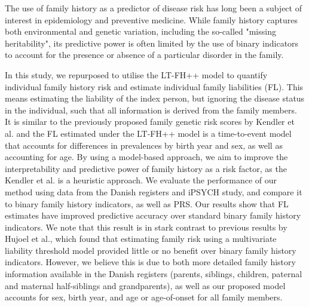 The use of family history as a predictor of disease risk has long been a subject of interest in epidemiology and preventive medicine. While family history captures both environmental and genetic variation, including the so-called "missing heritability", its predictive power is often limited by the use of binary indicators to account for the presence or absence of a particular disorder in the family. 

In this study, we repurposed to utilise the LT-FH++ model to quantify individual family history risk and estimate individual family liabilities (FL). This means estimating the liability of the index person, but ignoring the disease status in the individual, such that all information is derived from the family members. It is similar to the previously proposed family genetic risk scores by Kendler et al.\cite{kendler2021family} and the FL estimated under the LT-FH++ model is a time-to-event model that accounts for differences in prevalences by birth year and sex, as well as accounting for age. By using a model-based approach, we aim to improve the interpretability and predictive power of family history as a risk factor, as the Kendler et al. is a heuristic approach. We evaluate the performance of our method using data from the Danish registers and iPSYCH study, and compare it to binary family history indicators, as well as PRS. Our results show that FL estimates have improved predictive accuracy over standard binary family history indicators. We note that this result is in stark contrast to previous results by Hujoel et al.\cite{hujoel2022incorporating}, which found that estimating family risk using a multivariate liability threshold model provided little or no benefit over binary family history indicators. However, we believe this is due to both more detailed family history information available in the Danish registers (parents, siblings, children, paternal and maternal half-siblings and grandparents), as well as our proposed model accounts for sex, birth year, and age or age-of-onset for all family members. 

